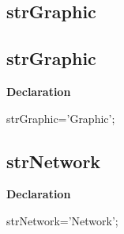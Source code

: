 \documentclass{report}
\newif\ifpdf
\begin{document}
\subsection*{\large{\textbf{strGraphic}}\normalsize\hspace{1ex}\hrulefill}
\else
\subsection*{strGraphic}
\fi
\label{trstrings-strGraphic}
\begin{list}{}{
\setlength{\itemindent}{0cm}
\setlength{\listparindent}{0cm}
\setlength{\leftmargin}{\evensidemargin}
\addtolength{\leftmargin}{\tmplength}
\settowidth{\labelsep}{X}
\addtolength{\leftmargin}{\labelsep}
\setlength{\labelwidth}{\tmplength}
}
\item[\textbf{Declaration}\hfill]
\ifpdf
\begin{flushleft}
\fi
\begin{ttfamily}
strGraphic='Graphic';\end{ttfamily}

\ifpdf
\end{flushleft}
\fi

\end{list}
\ifpdf
\subsection*{\large{\textbf{strNetwork}}\normalsize\hspace{1ex}\hrulefill}
\else
\subsection*{strNetwork}
\fi
\label{trstrings-strNetwork}
\begin{list}{}{
\setlength{\itemindent}{0cm}
\setlength{\listparindent}{0cm}
\setlength{\leftmargin}{\evensidemargin}
\addtolength{\leftmargin}{\tmplength}
\settowidth{\labelsep}{X}
\addtolength{\leftmargin}{\labelsep}
\setlength{\labelwidth}{\tmplength}
}
\item[\textbf{Declaration}\hfill]
\ifpdf
\begin{flushleft}
\fi
\begin{ttfamily}
strNetwork='Network';\end{ttfamily}

\ifpdf
\end{flushleft}
\fi

\end{list}
\ifpdf
\end{document}
